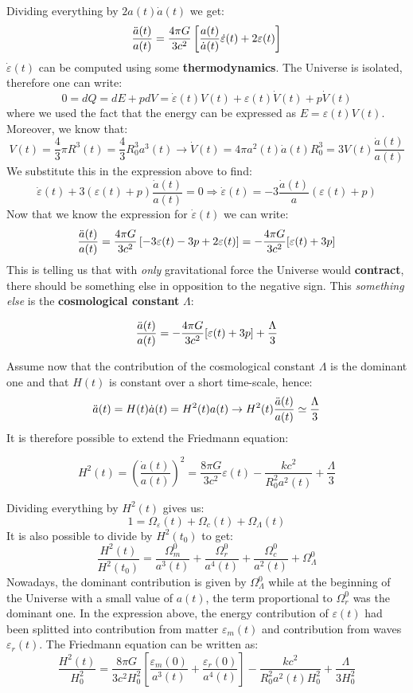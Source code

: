 \documentclass[10.75pt,a4paper,openright,bottom=2cm]{article}
\newcommand{\beginbox}[1]{\begin{tcolorbox}[width=\textwidth,colback={black!40},title={#1},colbacktitle={purple!55},coltitle=black]}
\renewcommand{\endbox}{\end{tcolorbox}\noindent}
\begin{document}
Dividing everything by $2a(t)\Dot{a}(t)$ we get:
\[
\frac{\Ddot{a}(t)}{a(t)}=\frac{4\pi G}{3c^2}\left[\frac{a(t)}{\Dot{a}(t)}\Dot{\varepsilon}(t)+2\varepsilon(t)\right]
\]
$\Dot{\varepsilon}(t)$ can be computed using some \textbf{thermodynamics}. The Universe is isolated, therefore one can write:
\[
0=dQ=dE+pdV=\Dot{\varepsilon}(t)V(t)+\varepsilon(t)\Dot{V}(t)+p\Dot{V}(t)
\]
where we used the fact that the energy can be expressed as $E=\varepsilon(t)V(t)$. Moreover, we know that:
\[
V(t)=\frac{4}{3}\pi R^3(t)=\frac{4}{3}R_0^3a^3(t)\to\Dot{V}(t)=4\pi a^2(t)\Dot{a}(t)R_0^3=3V(t)\frac{\Dot{a}(t)}{a(t)}
\]
We substitute this in the expression above to find:
\[
\Dot{\varepsilon}(t)+3(\varepsilon(t)+p)\frac{\Dot{a}(t)}{a(t)}=0\Rightarrow\Dot{\varepsilon}(t)=-3\frac{\Dot{a}(t)}{a}(\varepsilon(t)+p)
\]
Now that we know the expression for $\Dot{\varepsilon}(t)$ we can write:
\[
\frac{\Ddot{a}(t)}{a(t)}=\frac{4\pi G}{3c^2}\left[-3\varepsilon(t)-3p+2\varepsilon(t)\right]=-\frac{4\pi G}{3c^2}[\varepsilon(t)+3p]
\]
This is telling us that with \textit{only} gravitational force the Universe would \textbf{contract}, there should be something else in opposition to the negative sign. This \textit{something else} is the \textbf{cosmological constant} $\Lambda$:
\beginbox{Cosmological Constant} 
\[
\frac{\Ddot{a}(t)}{a(t)}=-\frac{4\pi G}{3c^2}[\varepsilon(t)+3p]+\frac{\Lambda}{3}
\]
\endbox
Assume now that the contribution of the cosmological constant $\Lambda$ is the dominant one and that $H(t)$ is constant over a short time-scale, hence:
\[
\Ddot{a}(t)=H(t)\Dot{a}(t)=H^2(t)a(t)\to H^2(t)\frac{\Ddot{a}(t)}{a(t)}\simeq\frac{\Lambda}{3}
\]
It is therefore possible to extend the Friedmann equation:
\beginbox{Full Metal Friedmann Equation}
\[
H^2(t)=\left(\frac{\Dot{a}(t)}{a(t)}\right)^2=\frac{8\pi G}{3c^2}\varepsilon(t)-\frac{kc^2}{R_0^2a^2(t)}+\frac{\Lambda}{3}
\]
\endbox
Dividing everything by $H^2(t)$ gives us:
\[
1=\Omega_\varepsilon(t)+\Omega_c(t)+\Omega_\Lambda(t)
\]
It is also possible to divide by $H^2(t_0)$ to get:
\[
\frac{H^2(t)}{H^2(t_0)}=\frac{\Omega_m^0}{a^3(t)}+\frac{\Omega_r^0}{a^4(t)}+\frac{\Omega_c^0}{a^2(t)}+\Omega_\Lambda^0
\]
Nowadays, the dominant contribution is given by $\Omega_\Lambda^0$ while at the beginning of the Universe with a small value of $a(t)$, the term proportional to $\Omega_r^0$ was the dominant one. In the expression above, the energy contribution of $\varepsilon(t)$ had been splitted into contribution from matter $\varepsilon_m(t)$ and contribution from waves $\varepsilon_r(t)$. The Friedmann equation can be written as:
\[
\frac{H^2(t)}{H_0^2}=\frac{8\pi G}{3c^2H_0^2}\left[\frac{\varepsilon_m(0)}{a^3(t)}+\frac{\varepsilon_r(0)}{a^4(t)}\right]-\frac{kc^2}{R_0^2a^2(t)H_0^2}+\frac{\Lambda}{3H_0^2}
\]
\end{document}
